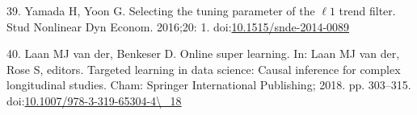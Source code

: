 \documentclass[10pt,letterpaper]{article}
\begin{document}
\leavevmode\hypertarget{ref-Yamada2016-fq}{}%
39. Yamada H, Yoon G. Selecting the tuning parameter of the \(\ell1\)
trend filter. Stud Nonlinear Dyn Econom. 2016;20: 1.
doi:\href{https://doi.org/10.1515/snde-2014-0089}{10.1515/snde-2014-0089}

\leavevmode\hypertarget{ref-Van_der_Laan2018-xq}{}%
40. Laan MJ van der, Benkeser D. Online super learning. In: Laan MJ van
der, Rose S, editors. Targeted learning in data science: Causal
inference for complex longitudinal studies. Cham: Springer International
Publishing; 2018. pp. 303--315.
doi:\href{https://doi.org/10.1007/978-3-319-65304-4/_18}{10.1007/978-3-319-65304-4\textbackslash{}\_18}

\nolinenumbers
\end{document}
